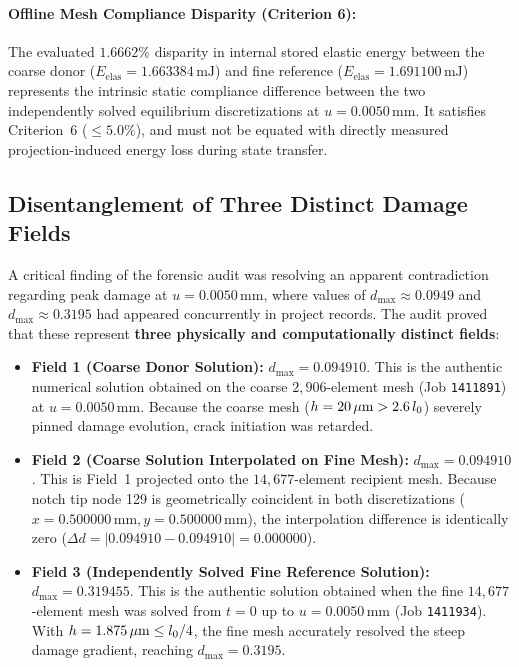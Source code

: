 \paragraph{Offline Mesh Compliance Disparity (Criterion 6):}
The evaluated $1.6662\%$ disparity in internal stored elastic energy between the coarse donor ($E_{\mathrm{elas}} = 1.663384\,\mathrm{mJ}$) and fine reference ($E_{\mathrm{elas}} = 1.691100\,\mathrm{mJ}$) represents the intrinsic static compliance difference between the two independently solved equilibrium discretizations at $u = 0.0050\,\mathrm{mm}$. It satisfies Criterion~6 ($\le 5.0\%$), and must not be equated with directly measured projection-induced energy loss during state transfer.

\subsection{Disentanglement of Three Distinct Damage Fields}
\label{subsec:method_c_three_damage_fields}

A critical finding of the forensic audit was resolving an apparent contradiction regarding peak damage at $u = 0.0050\,\mathrm{mm}$, where values of $d_{\max} \approx 0.0949$ and $d_{\max} \approx 0.3195$ had appeared concurrently in project records. The audit proved that these represent \textbf{three physically and computationally distinct fields}:
\begin{itemize}
  \item \textbf{Field 1 (Coarse Donor Solution):} $d_{\max} = 0.094910$. This is the authentic numerical solution obtained on the coarse $2{,}906$-element mesh (Job \texttt{1411891}) at $u = 0.0050\,\mathrm{mm}$. Because the coarse mesh ($h = 20\,\mu\mathrm{m} > 2.6\,l_0$) severely pinned damage evolution, crack initiation was retarded.
  \item \textbf{Field 2 (Coarse Solution Interpolated on Fine Mesh):} $d_{\max} = 0.094910$. This is Field~1 projected onto the $14{,}677$-element recipient mesh. Because notch tip node 129 is geometrically coincident in both discretizations ($x = 0.500000\,\mathrm{mm}, y = 0.500000\,\mathrm{mm}$), the interpolation difference is identically zero ($\Delta d = |0.094910 - 0.094910| = 0.000000$).
  \item \textbf{Field 3 (Independently Solved Fine Reference Solution):} $d_{\max} = 0.319455$. This is the authentic solution obtained when the fine $14{,}677$-element mesh was solved from $t = 0$ up to $u = 0.0050\,\mathrm{mm}$ (Job \texttt{1411934}). With $h = 1.875\,\mu\mathrm{m} \le l_0 / 4$, the fine mesh accurately resolved the steep damage gradient, reaching $d_{\max} = 0.3195$.
\end{itemize}

